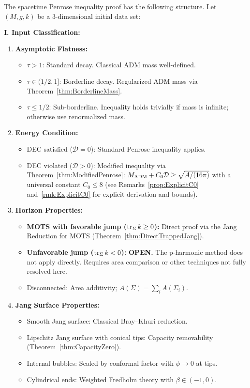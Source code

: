 \begin{theorem}\label{thm:MasterSynthesis}
The spacetime Penrose inequality proof has the following structure. Let $(M, g, k)$ be a 3-dimensional initial data set:

\textbf{I. Input Classification:}
\begin{enumerate}
    \item[(A)] \textbf{Asymptotic Flatness:}
        \begin{itemize}
            \item $\tau > 1$: Standard decay. Classical ADM mass well-defined.
            \item $\tau \in (1/2, 1]$: Borderline decay. Regularized ADM mass via Theorem~\ref{thm:BorderlineMass}.
            \item $\tau \le 1/2$: Sub-borderline. Inequality holds trivially if mass is infinite; otherwise use renormalized mass.
        \end{itemize}
    \item[(B)] \textbf{Energy Condition:}
        \begin{itemize}
            \item DEC satisfied ($\mathcal{D} = 0$): Standard Penrose inequality applies.
            \item DEC violated ($\mathcal{D} > 0$): Modified inequality via Theorem~\ref{thm:ModifiedPenrose}: $M_{\mathrm{ADM}} + C_0 \mathcal{D} \ge \sqrt{A/(16\pi)}$ with a universal constant $C_0 \le 8$ (see Remarks~\ref{prop:ExplicitC0} and~\ref{rmk:ExplicitC0} for explicit derivation and bounds).
        \end{itemize}
    \item[(C)] \textbf{Horizon Properties:}
        \begin{itemize}
            \item \textbf{MOTS with favorable jump ($\operatorname{tr}_\Sigma k \ge 0$):} Direct proof via the Jang Reduction for MOTS (Theorem~\ref{thm:DirectTrappedJang}).
            \item \textbf{Unfavorable jump ($\operatorname{tr}_\Sigma k < 0$):} \textbf{OPEN.} The p-harmonic method does not apply directly. Requires area comparison or other techniques not fully resolved here.
            \item Disconnected: Area additivity; $A(\Sigma) = \sum_i A(\Sigma_i)$.
        \end{itemize}
    \item[(D)] \textbf{Jang Surface Properties:}
        \begin{itemize}
            \item Smooth Jang surface: Classical Bray--Khuri reduction.
            \item Lipschitz Jang surface with conical tips: Capacity removability (Theorem~\ref{thm:CapacityZero}).
            \item Internal bubbles: Sealed by conformal factor with $\phi \to 0$ at tips.
            \item Cylindrical ends: Weighted Fredholm theory with $\beta \in (-1, 0)$.
        \end{itemize}
\end{enumerate}


\end{theorem}
